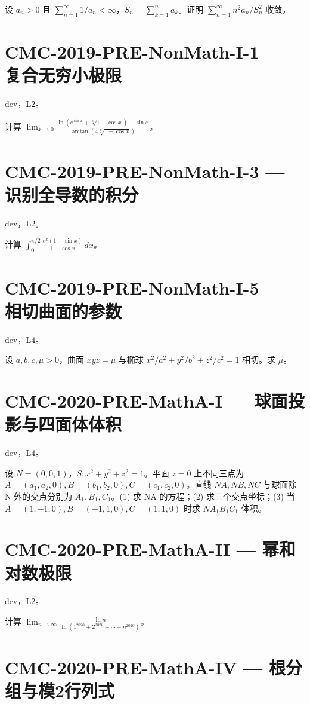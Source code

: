 \documentclass[UTF8]{ctexart}
\begin{document}
设 $a_n>0$ 且 $\sum_{n=1}^\infty1/a_n<\infty$，$S_n=\sum_{k=1}^n a_k$。证明 $\sum_{n=1}^\infty n^2a_n/S_n^2$ 收敛。

\section*{CMC-2019-PRE-NonMath-I-1 — 复合无穷小极限}

dev，L2。

计算 $\displaystyle\lim_{x\to0}\frac{\ln(e^{\sin x}+\sqrt[3]{1-\cos x})-\sin x}{\arctan(4\sqrt[3]{1-\cos x})}$。

\section*{CMC-2019-PRE-NonMath-I-3 — 识别全导数的积分}

dev，L2。

计算 $\displaystyle\int_0^{\pi/2}\frac{e^x(1+\sin x)}{1+\cos x}\,dx$。

\section*{CMC-2019-PRE-NonMath-I-5 — 相切曲面的参数}

dev，L4。

设 $a,b,c,\mu>0$，曲面 $xyz=\mu$ 与椭球 $x^2/a^2+y^2/b^2+z^2/c^2=1$ 相切。求 $\mu$。

\section*{CMC-2020-PRE-MathA-I — 球面投影与四面体体积}

dev，L4。

设 $N=(0,0,1)$，$S:x^2+y^2+z^2=1$。平面 $z=0$ 上不同三点为 $A=(a_1,a_2,0),B=(b_1,b_2,0),C=(c_1,c_2,0)$。直线 $NA,NB,NC$ 与球面除 N 外的交点分别为 $A_1,B_1,C_1$。(1) 求 NA 的方程；(2) 求三个交点坐标；(3) 当 $A=(1,-1,0),B=(-1,1,0),C=(1,1,0)$ 时求 $NA_1B_1C_1$ 体积。

\section*{CMC-2020-PRE-MathA-II — 幂和对数极限}

dev，L2。

计算 $\displaystyle\lim_{n\to\infty}\frac{\ln n}{\ln(1^{2020}+2^{2020}+\cdots+n^{2020})}$。

\section*{CMC-2020-PRE-MathA-IV — 根分组与模2行列式}
\end{document}
